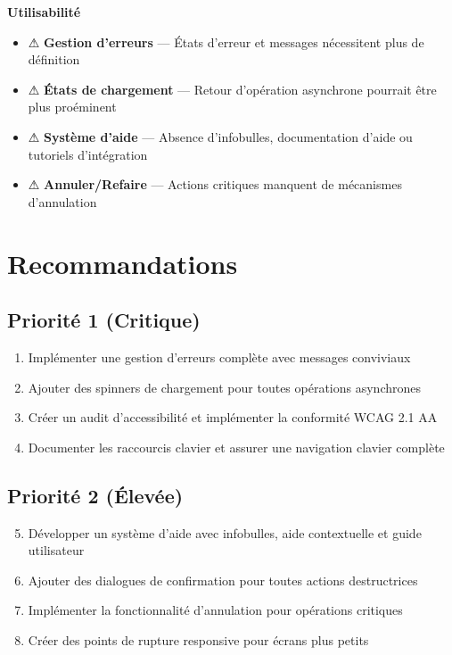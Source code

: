 \documentclass[12pt, a4paper]{report}
\begin{document}
\begin{warningbox}
\textbf{Utilisabilité}
\begin{itemize}
    \item ⚠ \textbf{Gestion d'erreurs} --- États d'erreur et messages nécessitent plus de définition
    \item ⚠ \textbf{États de chargement} --- Retour d'opération asynchrone pourrait être plus proéminent
    \item ⚠ \textbf{Système d'aide} --- Absence d'infobulles, documentation d'aide ou tutoriels d'intégration
    \item ⚠ \textbf{Annuler/Refaire} --- Actions critiques manquent de mécanismes d'annulation
\end{itemize}
\end{warningbox}

\section{Recommandations}

\subsection{Priorité 1 (Critique)}
\begin{enumerate}
    \item Implémenter une gestion d'erreurs complète avec messages conviviaux
    \item Ajouter des spinners de chargement pour toutes opérations asynchrones
    \item Créer un audit d'accessibilité et implémenter la conformité WCAG 2.1 AA
    \item Documenter les raccourcis clavier et assurer une navigation clavier complète
\end{enumerate}

\subsection{Priorité 2 (Élevée)}
\begin{enumerate}
    \setcounter{enumi}{4}
    \item Développer un système d'aide avec infobulles, aide contextuelle et guide utilisateur
    \item Ajouter des dialogues de confirmation pour toutes actions destructrices
    \item Implémenter la fonctionnalité d'annulation pour opérations critiques
    \item Créer des points de rupture responsive pour écrans plus petits
\end{enumerate}
\end{document}
